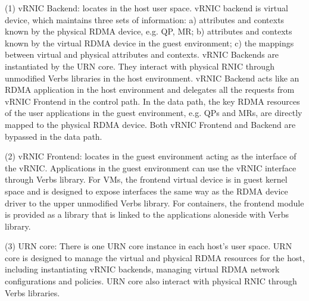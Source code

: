 (1) vRNIC Backend: locates in the host user space. vRNIC backend is virtual device, which maintains three sets of information: a) attributes and contexts known by the physical RDMA device, e.g. QP, MR; b) attributes and contexts known by the virtual RDMA device in the guest environment; c) the mappings between virtual and physical attributes and contexts. vRNIC Backends are instantiated by the URN core. They interact with physical RNIC through unmodified Verbs libraries in the host environment. vRNIC Backend acts like an RDMA application in the host environment and delegates all the requests from vRNIC Frontend in the control path. In the data path, the key RDMA resources of the user applications in the guest environment, e.g. QPs and MRs, are directly mapped to the physical RDMA device. Both vRNIC Frontend and Backend are bypassed in the data path.

(2) vRNIC Frontend: locates in the guest environment acting as the interface of the vRNIC. Applications in the guest environment can use the vRNIC interface through Verbs library. For VMs, the frontend virtual device is in guest kernel space and is designed to expose interfaces the same way as the RDMA device driver to the upper unmodified Verbs library. For containers, the frontend module is provided as a library that is linked to the applications aloneside with Verbs library.

(3) URN core: There is one URN core instance in each host's user space. URN core is designed to manage the virtual and physical RDMA resources for the host, including instantiating vRNIC backends, managing virtual RDMA network configurations and policies. URN core also interact with physical RNIC through Verbs libraries. 

